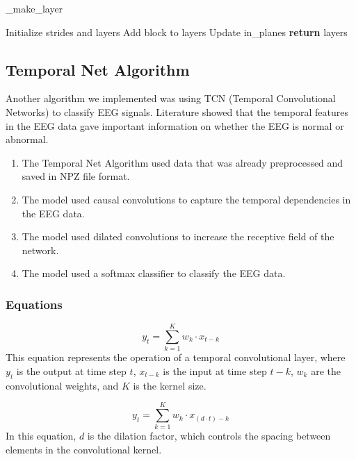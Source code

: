 \documentclass[10pt]{article}
\begin{document}
\begin{algorithm}[H]
  \caption{\_make\_layer}
  \begin{algorithmic}[3]
      \State Initialize strides and layers
      \State
        \State Add block to layers
        \State Update in\_planes
      \EndFor
      \State
      \State \textbf{return} layers
    \EndProcedure
  \end{algorithmic}
\end{algorithm}


\subsection{Temporal Net Algorithm}
Another algorithm we implemented was using TCN (Temporal Convolutional Networks) to classify EEG signals. Literature showed that the temporal features in the EEG data gave important information on whether the EEG is normal or abnormal.

\begin{enumerate}
    \item The Temporal Net Algorithm used data that was already preprocessed and saved in NPZ file format.
    \item The model used causal convolutions to capture the temporal dependencies in the EEG data.
    \item The model used dilated convolutions to increase the receptive field of the network.
    \item The model used a softmax classifier to classify the EEG data.
\end{enumerate}

\subsubsection{Equations}
\[
y_t = \sum_{k=1}^{K} w_k \cdot x_{t-k}
\]
This equation represents the operation of a temporal convolutional layer, where \( y_t \) is the output at time step \( t \), \( x_{t-k} \) is the input at time step \( t-k \), \( w_k \) are the convolutional weights, and \( K \) is the kernel size.

\[
y_t = \sum_{k=1}^{K} w_k \cdot x_{(d \cdot t) - k}
\]
In this equation, \( d \) is the dilation factor, which controls the spacing between elements in the convolutional kernel.
\end{document}
